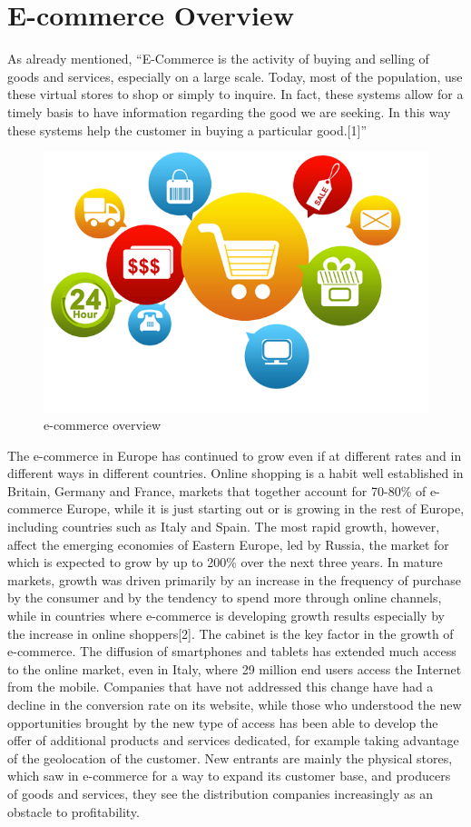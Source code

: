 \section{E-commerce Overview}
\label{sec:e_commerce_overview}
As already mentioned, “E-Commerce is the activity of buying and selling of goods and services, especially on a large scale. Today, most of the population, use these virtual stores to shop or simply to inquire. In fact, these systems allow for a timely basis to have information regarding the good we are seeking. In this way these systems help the customer in buying a particular good.[1]”
\newline
\begin{figure}[htb]
 \centering
 \includegraphics[width=0.8\linewidth]{images/chapter1/e-commerce.png}\hfill
 \caption[e-commerce overview]{e-commerce overview}
 \label{fig:e_commerce_overview}
\end{figure}
The e-commerce in Europe has continued to grow even if at different rates and in different ways in different countries. Online shopping is a habit well established in Britain, Germany and France, markets that together account for 70-80\% of e-commerce Europe, while it is just starting out or is growing in the rest of Europe, including countries such as Italy and Spain. The most rapid growth, however, affect the emerging economies of Eastern Europe, led by Russia, the market for which is expected to grow by up to 200\% over the next three years.
\newline
In mature markets, growth was driven primarily by an increase in the frequency of purchase by the consumer and by the tendency to spend more through online channels, while in countries where e-commerce is developing growth results especially by the increase in online shoppers[2].
\newline
The cabinet is the key factor in the growth of e-commerce. The diffusion of smartphones and tablets has extended much access to the online market, even in Italy, where 29 million end users access the Internet from the mobile. Companies that have not addressed this change have had a decline in the conversion rate on its website, while those who understood the new opportunities brought by the new type of access has been able to develop the offer of additional products and services dedicated, for example taking advantage of the geolocation of the customer. New entrants are mainly the physical stores, which saw in e-commerce for a way to expand its customer base, and producers of goods and services, they see the distribution companies increasingly as an obstacle to profitability.
